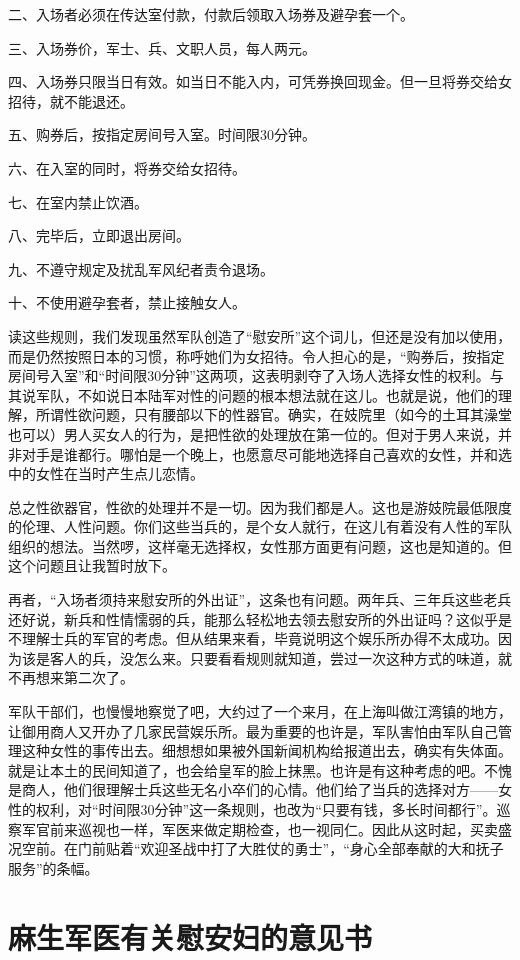 \documentclass[12pt,UTF8]{ctexbook}
\begin{document}
二、入场者必须在传达室付款，付款后领取入场券及避孕套一个。

三、入场券价，军士、兵、文职人员，每人两元。

四、入场券只限当日有效。如当日不能入内，可凭券换回现金。但一旦将券交给女招待，就不能退还。

五、购券后，按指定房间号入室。时间限30分钟。

六、在入室的同时，将券交给女招待。

七、在室内禁止饮酒。

八、完毕后，立即退出房间。

九、不遵守规定及扰乱军风纪者责令退场。

十、不使用避孕套者，禁止接触女人。

读这些规则，我们发现虽然军队创造了“慰安所”这个词儿，但还是没有加以使用，而是仍然按照日本的习惯，称呼她们为女招待。令人担心的是，“购券后，按指定房间号入室”和“时间限30分钟”这两项，这表明剥夺了入场人选择女性的权利。与其说军队，不如说日本陆军对性的问题的根本想法就在这儿。也就是说，他们的理解，所谓性欲问题，只有腰部以下的性器官。确实，在妓院里（如今的土耳其澡堂也可以）男人买女人的行为，是把性欲的处理放在第一位的。但对于男人来说，并非对手是谁都行。哪怕是一个晚上，也愿意尽可能地选择自己喜欢的女性，并和选中的女性在当时产生点儿恋情。

总之性欲器官，性欲的处理并不是一切。因为我们都是人。这也是游妓院最低限度的伦理、人性问题。你们这些当兵的，是个女人就行，在这儿有着没有人性的军队组织的想法。当然啰，这样毫无选择权，女性那方面更有问题，这也是知道的。但这个问题且让我暂时放下。

再者，“入场者须持来慰安所的外出证”，这条也有问题。两年兵、三年兵这些老兵还好说，新兵和性情懦弱的兵，能那么轻松地去领去慰安所的外出证吗？这似乎是不理解士兵的军官的考虑。但从结果来看，毕竟说明这个娱乐所办得不太成功。因为该是客人的兵，没怎么来。只要看看规则就知道，尝过一次这种方式的味道，就不再想来第二次了。

军队干部们，也慢慢地察觉了吧，大约过了一个来月，在上海叫做江湾镇的地方，让御用商人又开办了几家民营娱乐所。最为重要的也许是，军队害怕由军队自己管理这种女性的事传出去。细想想如果被外国新闻机构给报道出去，确实有失体面。就是让本土的民间知道了，也会给皇军的脸上抹黑。也许是有这种考虑的吧。不愧是商人，他们很理解士兵这些无名小卒们的心情。他们给了当兵的选择对方——女性的权利，对“时间限30分钟”这一条规则，也改为“只要有钱，多长时间都行”。巡察军官前来巡视也一样，军医来做定期检查，也一视同仁。因此从这时起，买卖盛况空前。在门前贴着“欢迎圣战中打了大胜仗的勇士”，“身心全部奉献的大和抚子服务”的条幅。

\section{麻生军医有关慰安妇的意见书}
\end{document}

